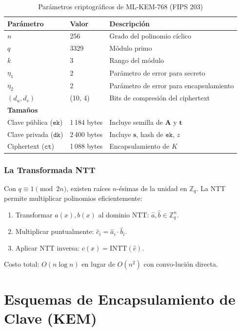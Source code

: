 \documentclass[12pt,a4paper,twoside,openright]{book}
\theoremstyle{plain}
\theoremstyle{definition}
\theoremstyle{remark}
\newcommand{\Zq}{\mathbb{Z}_q}
\newcommand{\vv}[1]{\mathbf{#1}}
\newcommand{\mm}[1]{\mathbf{#1}}
\begin{document}
\begin{table}[H]
\centering
\caption{Par\'ametros criptogr\'aficos de ML-KEM-768 (FIPS 203)}
\label{tab:params_mlkem768}
\begin{tabular}{lll}
\toprule
\textbf{Par\'ametro} & \textbf{Valor} & \textbf{Descripci\'on} \\
\midrule
$n$ & 256 & Grado del polinomio c\'iclico \\
$q$ & 3329 & M\'odulo primo \\
$k$ & 3 & Rango del m\'odulo \\
$\eta_1$ & 2 & Par\'ametro de error para secreto \\
$\eta_2$ & 2 & Par\'ametro de error para encapsulamiento \\
$(d_u, d_v)$ & (10, 4) & Bits de compresi\'on del ciphertext \\
\midrule
\multicolumn{3}{l}{\textbf{Tama\~nos}} \\
Clave p\'ublica ($\mathtt{ek}$) & 1\,184 bytes & Incluye semilla de $\mm{A}$ y $\vv{t}$ \\
Clave privada ($\mathtt{dk}$) & 2\,400 bytes & Incluye $\vv{s}$, hash de $\mathtt{ek}$, $z$ \\
Ciphertext ($\mathtt{ct}$) & 1\,088 bytes & Encapsulamiento de $K$ \\
\bottomrule
\end{tabular}
\end{table}

\subsection{La Transformada NTT}

Con $q \equiv 1 \pmod{2n}$, existen ra\'ices $n$-\'esimas de la unidad en
$\Zq$. La NTT permite multiplicar polinomios eficientemente:
\begin{enumerate}
  \item Transformar $a(x), b(x)$ al dominio NTT: $\hat{a}, \hat{b} \in \Zq^n$.
  \item Multiplicar puntualmente: $\hat{c}_i = \hat{a}_i \cdot \hat{b}_i$.
  \item Aplicar NTT inversa: $c(x) = \mathrm{INTT}(\hat{c})$.
\end{enumerate}
Costo total: $O(n \log n)$ en lugar de $O(n^2)$ con convo-luci\'on directa.

\chapter{Esquemas de Encapsulamiento de Clave (KEM)}
\label{chap:kem}
\end{document}
